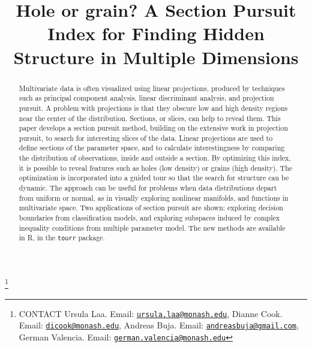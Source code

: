 \documentclass[]{interact}
\theoremstyle{plain}%
\theoremstyle{definition}
\theoremstyle{remark}
\begin{document}
\articletype{}

\title{Hole or grain? A Section Pursuit Index for Finding Hidden Structure in
Multiple Dimensions}


\author{
}

\thanks{CONTACT Ursula Laa. Email: \href{mailto:ursula.laa@monash.edu}{\nolinkurl{ursula.laa@monash.edu}}, Dianne Cook. Email: \href{mailto:dicook@monash.edu}{\nolinkurl{dicook@monash.edu}}, Andreas Buja. Email: \href{mailto:andreasbuja@gmail.com}{\nolinkurl{andreasbuja@gmail.com}}, German Valencia. Email: \href{mailto:german.valencia@monash.edu}{\nolinkurl{german.valencia@monash.edu}}}

\maketitle

\begin{abstract}
Multivariate data is often visualized using linear projections, produced
by techniques such as principal component analysis, linear discriminant
analysis, and projection pursuit. A problem with projections is that
they obscure low and high density regions near the center of the
distribution. Sections, or slices, can help to reveal them. This paper
develops a section pursuit method, building on the extensive work in
projection pursuit, to search for interesting slices of the data. Linear
projections are used to define sections of the parameter space, and to
calculate interestingness by comparing the distribution of observations,
inside and outside a section. By optimizing this index, it is possible
to reveal features such as holes (low density) or grains (high density).
The optimization is incorporated into a guided tour so that the search
for structure can be dynamic. The approach can be useful for problems
when data distributions depart from uniform or normal, as in visually
exploring nonlinear manifolds, and functions in multivariate space. Two
applications of section pursuit are shown: exploring decision boundaries
from classification models, and exploring subspaces induced by complex
inequality conditions from multiple parameter model. The new methods are
available in R, in the \texttt{tourr} package.
\end{abstract}
\end{document}
